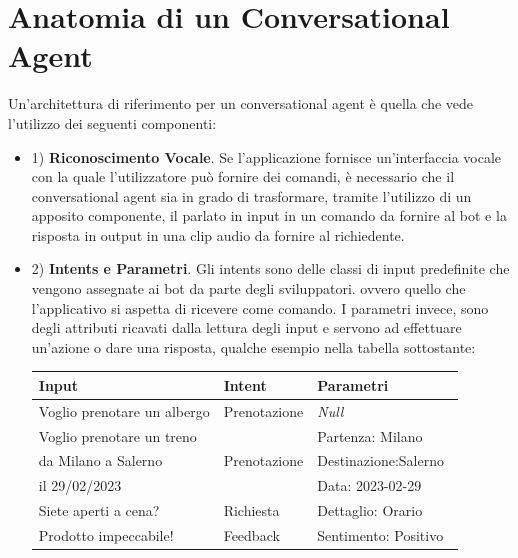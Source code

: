 \section{Anatomia di un Conversational Agent}
Un'architettura di riferimento per un conversational agent è quella che vede l'utilizzo dei seguenti componenti:
\begin{itemize}
    \item 1) \textbf{Riconoscimento Vocale}. Se l'applicazione fornisce un'interfaccia vocale con la quale l'utilizzatore può fornire dei comandi, è necessario che il conversational agent sia in grado di trasformare, tramite l'utilizzo di un apposito componente, il parlato in input in un comando da fornire al bot e la risposta in output in una clip audio da fornire al richiedente.\cite{srivastava2019reference}
    
    \item 2) \textbf{Intents e Parametri}. Gli intents sono delle classi di input predefinite che vengono assegnate ai bot da parte degli sviluppatori. ovvero quello che l'applicativo si aspetta di ricevere come comando. I parametri invece, sono degli attributi ricavati dalla lettura degli input e servono ad effettuare un'azione o dare una risposta, qualche esempio nella tabella sottostante:
    \begin{table}[h]
    \centering
    \begin{tabular}{|lll|} 
    \hline
    \textbf{Input}              & \textbf{Intent}               &     \textbf{Parametri}     \\ 
    \hline
    Voglio prenotare un albergo & Prenotazione                  &     \textit{Null}          \\ 
    \hline
    Voglio prenotare un treno~  & \multirow{3}{*}{Prenotazione} &     Partenza: Milano       \\
    da Milano a Salerno~        &                               &     Destinazione:Salerno~  \\
    il 29/02/2023               &                               & Data:     2023-02-29       \\ 
    \hline
    Siete aperti a cena?~       & Richiesta~                    &     Dettaglio: Orario      \\ 
    \hline
    Prodotto impeccabile!~      & Feedback~                     &     Sentimento: Positivo   \\
    \hline
    \end{tabular}
    \end{table}
    

\end{itemize}
